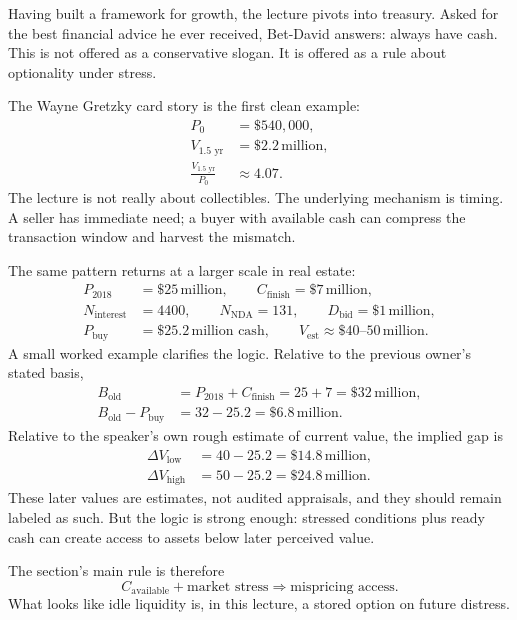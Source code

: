 Having built a framework for growth, the lecture pivots into treasury. Asked for the best financial advice he ever received, Bet-David answers: always have cash. This is not offered as a conservative slogan. It is offered as a rule about optionality under stress.

The Wayne Gretzky card story is the first clean example:
\begin{align}
P_0 &= \$540{,}000,\\
V_{1.5\text{ yr}} &= \$2.2\,\text{million},\\
\frac{V_{1.5\text{ yr}}}{P_0} &\approx 4.07.
\end{align}
The lecture is not really about collectibles. The underlying mechanism is timing. A seller has immediate need; a buyer with available cash can compress the transaction window and harvest the mismatch.

The same pattern returns at a larger scale in real estate:
\begin{align}
P_{2018} &= \$25\,\text{million},\qquad
C_{\text{finish}} = \$7\,\text{million},\\
N_{\text{interest}} &= 4400,\qquad
N_{\text{NDA}} = 131,\qquad
D_{\text{bid}} = \$1\,\text{million},\\
P_{\text{buy}} &= \$25.2\,\text{million cash},\qquad
V_{\text{est}} \approx \$40\text{--}50\,\text{million}.
\end{align}
A small worked example clarifies the logic. Relative to the previous owner's stated basis,
\begin{align}
B_{\text{old}} &= P_{2018}+C_{\text{finish}} = 25+7 = \$32\,\text{million},\\
B_{\text{old}}-P_{\text{buy}} &= 32-25.2 = \$6.8\,\text{million}.
\end{align}
Relative to the speaker's own rough estimate of current value, the implied gap is
\begin{align}
\Delta V_{\text{low}} &= 40-25.2 = \$14.8\,\text{million},\\
\Delta V_{\text{high}} &= 50-25.2 = \$24.8\,\text{million}.
\end{align}
These later values are estimates, not audited appraisals, and they should remain labeled as such. But the logic is strong enough: stressed conditions plus ready cash can create access to assets below later perceived value.

The section's main rule is therefore
\begin{equation}
C_{\text{available}}+\text{market stress}\Rightarrow \text{mispricing access}.
\end{equation}
What looks like idle liquidity is, in this lecture, a stored option on future distress.

